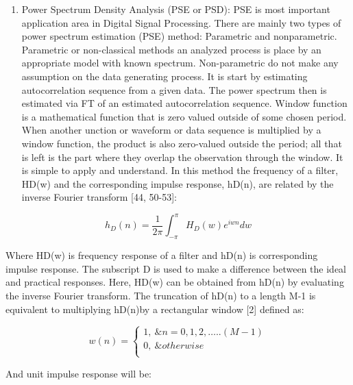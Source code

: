 \begin{enumerate}
	\item Power Spectrum Density Analysis (PSE or PSD): PSE is most important application area in Digital Signal Processing. There are mainly two types of power spectrum estimation (PSE) method: Parametric and nonparametric. Parametric or non-classical methods an analyzed process is place by an appropriate model with known spectrum. Non-parametric do not make any assumption on the data generating process. It is start by estimating autocorrelation sequence from a given data. The power spectrum then is estimated via FT of an estimated autocorrelation sequence. Window function is a mathematical function that is zero valued outside of some chosen period. When another unction or waveform or data sequence is multiplied by a window function, the product is also zero-valued outside the period; all that is left is the part where they overlap the observation through the window. It is simple to apply and understand. In this method the frequency of a filter, HD(w) and the corresponding impulse response, hD(n), are related by the inverse Fourier transform [44, 50-53]:
\end{enumerate}\par


\begin{equation}\tag{13}
h_{D} \left( n \right) = \frac{1}{2 \pi } \int _{- \pi }^{ \pi }H_{D} \left( w \right) e^{iwn}dw
\end{equation}
\begin{justify}
Where HD(w) is frequency response of a filter and hD(n) is corresponding impulse response. The subscript D is used to make a difference between the ideal and practical responses. Here, HD(w) can be obtained from hD(n) by evaluating the inverse Fourier transform. The truncation of hD(n) to a length M-1 is equivalent to multiplying hD(n)by a rectangular window [2] defined as:
\end{justify}\par


\begin{equation}\tag{14}
w \left( n \right) = \left\{ \begin{array}{ll}
	1,~ \&n=0,1,2, \ldots .. \left( M-1 \right) \\
	0,~ \&otherwise\\
	\end{array}
\end{equation}
\begin{justify}
And unit impulse response will be:
\end{justify}\par


